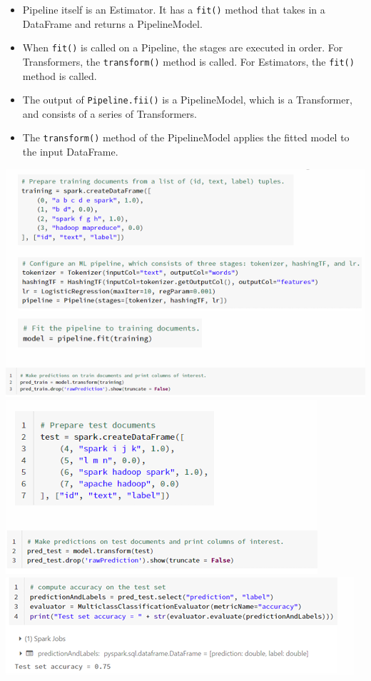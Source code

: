 \documentclass[10pt, landscape]{article}
\begin{document}
\begin{multicols*}{4}
\begin{itemize}
    \item Pipeline itself is an Estimator. It has a \texttt{fit()} method that takes in a DataFrame and returns a PipelineModel.
    \item When \texttt{fit()} is called on a Pipeline, the stages are executed in order. For Transformers, the \texttt{transform()} method is called. For Estimators, the \texttt{fit()} method is called.
    \item The output of \texttt{Pipeline.fii()} is a PipelineModel, which is a Transformer, and consists of a series of Transformers.
    \item The \texttt{transform()} method of the PipelineModel applies the fitted model to the input DataFrame.
  \end{itemize}

  \includegraphics[width=0.95\linewidth]{ml_code_ex1.png}
  \includegraphics[width=0.95\linewidth]{ml_code_ex2.png} 
  \includegraphics[width=0.95\linewidth]{ml_code_ex3.png} 


\end{multicols*}
\end{document}
